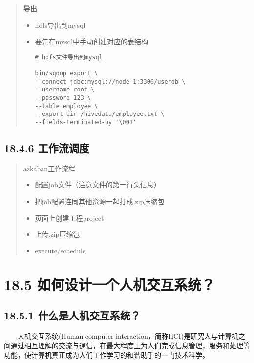 \begin{quote}
\textbf{导出}

\begin{itemize}
\item
  hdfs导出到mysql
\item
  要先在mysql中手动创建对应的表结构

\begin{verbatim}
# hdfs文件导出到mysql

bin/sqoop export \
--connect jdbc:mysql://node-1:3306/userdb \
--username root \
--password 123 \
--table employee \
--export-dir /hivedata/employee.txt \
--fields-terminated-by '\001'
\end{verbatim}
\end{itemize}
\end{quote}

\subsection{18.4.6 工作流调度}\label{ux5de5ux4f5cux6d41ux8c03ux5ea6}

\begin{quote}
azkaban工作流程

\begin{itemize}
\item
  配置job文件（注意文件的第一行头信息）
\item
  把job配置连同其他资源一起打成.zip压缩包
\item
  页面上创建工程project
\item
  上传.zip压缩包
\item
  execute/schedule
\end{itemize}
\end{quote}

\section{18.5
如何设计一个人机交互系统？}\label{ux5982ux4f55ux8bbeux8ba1ux4e00ux4e2aux4ebaux673aux4ea4ux4e92ux7cfbux7edf}

\subsection{18.5.1
什么是人机交互系统？}\label{ux4ec0ux4e48ux662fux4ebaux673aux4ea4ux4e92ux7cfbux7edf}

  人机交互系统(Human-computer
interaction，简称HCI)是研究人与计算机之间通过相互理解的交流与通信，在最大程度上为人们完成信息管理，服务和处理等功能，使计算机真正成为人们工作学习的和谐助手的一门技术科学。

